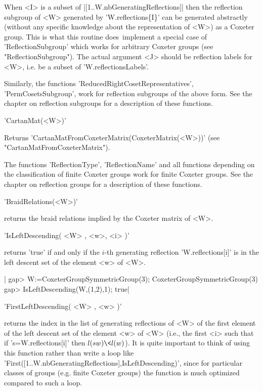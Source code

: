 When  <I>  is  a  subset of  |[1..W.nbGeneratingReflections]|  then  the
reflection  subgroup  of  <W>   generated  by  'W.reflections\{I\}'  can
be  generated  abstractly  (without  any specific  knowledge  about  the
representation of  <W>) as a  Coxeter group.  This is what  this routine
does\:\  implement a  special case  of 'ReflectionSubgroup'  which works
for  arbitrary Coxeter  groups  (see  "ReflectionSubgroup"). The  actual
argument <J>  should be reflection labels  for <W>, i.e. be  a subset of
'W.reflectionsLabels'.

Similarly,     the     functions     'ReducedRightCosetRepresentatives',
'PermCosetsSubgroup', work  for reflection subgroups of  the above form.
See  the chapter  on reflection  subgroups  for a  description of  these
functions.

'CartanMat(<W>)'

Returns       'CartanMatFromCoxeterMatrix(CoxeterMatrix(<W>))'      (see
"CartanMatFromCoxeterMatrix").

The  functions  'ReflectionType',  'ReflectionName'  and  all  functions
depending on the classification of finite Coxeter groups work for finite
Coxeter groups. See  the chapter on reflection groups  for a description
of these functions.

'BraidRelations(<W>)'

returns the braid relations implied by the Coxeter matrix of <W>.


'IsLeftDescending( <W> , <w>, <i> )'

returns  'true'  if  and  only   if  the  $i$-th  generating  reflection
'W.reflections[i]' is in the left descent set of the element <w> of <W>.

|    gap> W:=CoxeterGroupSymmetricGroup(3);
    CoxeterGroupSymmetricGroup(3)
    gap> IsLeftDescending(W,(1,2),1);
    true|



'FirstLeftDescending( <W> , <w> )'

returns the  index in the list  of generating reflections of  <W> of the
first element of the  left descent set of the element  <w> of <W> (i.e.,
the first <i> such that  if 's=W.reflections[i]' then $l(sw)\<l(w)$). It
is quite  important to think  of using  this function rather  than write
a  loop  like  'First([1..W.nbGeneratingReflections],IsLeftDescending)',
since for particular classes of  groups (e.g. finite Coxeter groups) the
function is much optimized compared to such a loop.

